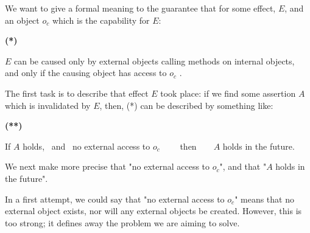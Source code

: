 We want to give a formal meaning to the guarantee that for some effect, $E$, and an object $o_c$ which is the capability for $E$:

\vspace{.1cm}

  \begin{minipage}{.05\textwidth}
   \textbf{(*)}
\end{minipage}
\hfill
\begin{minipage}{.95\textwidth}
\begin{flushleft}
$E$  can be caused only  by external objects calling methods on internal objects, \\
and only if the causing object has access  to $o_c$ . 
\end{flushleft}
\end{minipage}

\vspace{.1cm}


\noindent 
The first task is to describe that effect  $E$ took place: if we  find  some assertion $A$ 
 which is invalidated by $E$, then, (*) can be described by something like:

\vspace{.1cm}

  \begin{minipage}{.05\textwidth}
   \textbf{(**)}
\end{minipage}
\hfill
\begin{minipage}{.95\textwidth}
\begin{flushleft}
If $A$ holds, \  and \     no external access to  $o_c$ \ \ \ \ then\  \ \  \ $A$ holds in the future. 
\end{flushleft}
\end{minipage}

\vspace{.1cm}


\noindent 
We next make more precise that "no external access to  $o_c$", and that "$A$ holds in the future".

In a first attempt, we could say that "no external access to  $o_c$" means  that no external object exists, nor will any external objects be created.
 However, this is too strong; it defines away the problem we are aiming to solve.

